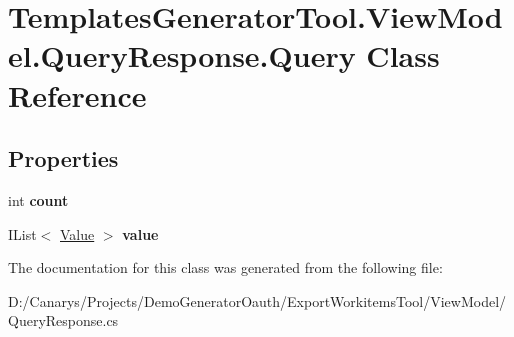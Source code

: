 \hypertarget{class_templates_generator_tool_1_1_view_model_1_1_query_response_1_1_query}{}\section{Templates\+Generator\+Tool.\+View\+Model.\+Query\+Response.\+Query Class Reference}
\label{class_templates_generator_tool_1_1_view_model_1_1_query_response_1_1_query}
\subsection*{Properties}
\begin{DoxyCompactItemize}
\item 
\mbox{\label{class_templates_generator_tool_1_1_view_model_1_1_query_response_1_1_query_a3ccef051ff74d634d054a7d33e55847a}} 
int {\bfseries count}
\item 
\mbox{\label{class_templates_generator_tool_1_1_view_model_1_1_query_response_1_1_query_ab587fbe453d02a48548d64ea0ca1da8e}} 
I\+List$<$ \mbox{\hyperlink{class_templates_generator_tool_1_1_view_model_1_1_query_response_1_1_value}{Value}} $>$ {\bfseries value}
\end{DoxyCompactItemize}


The documentation for this class was generated from the following file\+:\begin{DoxyCompactItemize}
\item 
D\+:/\+Canarys/\+Projects/\+Demo\+Generator\+Oauth/\+Export\+Workitems\+Tool/\+View\+Model/Query\+Response.\+cs\end{DoxyCompactItemize}
